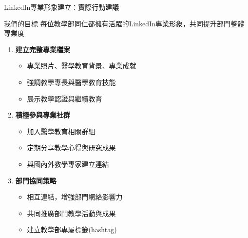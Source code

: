 \documentclass[aspectratio=169]{beamer}
\begin{document}
\begin{frame}{LinkedIn專業形象建立：實際行動建議}
  \begin{block}{我們的目標}
    每位教學部同仁都擁有活躍的LinkedIn專業形象，共同提升部門整體專業度
  \end{block}

  \begin{enumerate}
    \item \textbf{建立完整專業檔案}
      \begin{itemize}
        \item 專業照片、醫學教育背景、專業成就
        \item 強調教學專長與醫學教育技能
        \item 展示教學認證與繼續教育
      \end{itemize}
    \item \textbf{積極參與專業社群}
      \begin{itemize}
        \item 加入醫學教育相關群組
        \item 定期分享教學心得與研究成果
        \item 與國內外教學專家建立連結
      \end{itemize}
    \item \textbf{部門協同策略}
      \begin{itemize}
        \item 相互連結，增強部門網絡影響力
        \item 共同推廣部門教學活動與成果
        \item 建立教學部專屬標籤(hashtag)
      \end{itemize}
  \end{enumerate}
\end{frame}
\end{document}
